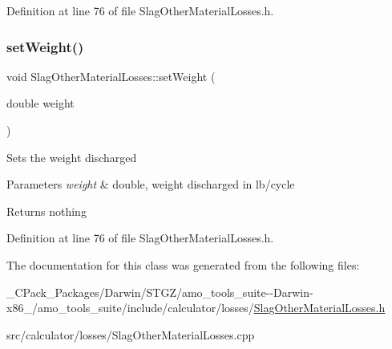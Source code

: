 Definition at line 76 of file Slag\+Other\+Material\+Losses.\+h.

\mbox{\label{class_slag_other_material_losses_a230a178f2ead59cd498b620e4bb4910f}} 
\subsubsection{\texorpdfstring{set\+Weight()}{setWeight()}\hspace{0.1cm}{\footnotesize\ttfamily [3/3]}}
{\footnotesize\ttfamily void Slag\+Other\+Material\+Losses\+::set\+Weight (\begin{DoxyParamCaption}\item[{double}]{weight }\end{DoxyParamCaption})\hspace{0.3cm}{\ttfamily [inline]}}

Sets the weight discharged


\begin{DoxyParams}{Parameters}
{\em weight} & double, weight discharged in lb/cycle\\
\hline
\end{DoxyParams}
\begin{DoxyReturn}{Returns}
nothing 
\end{DoxyReturn}


Definition at line 76 of file Slag\+Other\+Material\+Losses.\+h.



The documentation for this class was generated from the following files\+:\begin{DoxyCompactItemize}
\item 
\+\_\+\+C\+Pack\+\_\+\+Packages/\+Darwin/\+S\+T\+G\+Z/amo\+\_\+tools\+\_\+suite-\/-\/\+Darwin-\/x86\+\_/amo\+\_\+tools\+\_\+suite/include/calculator/losses/\hyperlink{___c_pack___packages_2_darwin_2_s_t_g_z_2amo__tools__suite--_darwin-x86__64_2amo__tools__suite_2dc0a6fddc3bab53e61620aff16484645}{Slag\+Other\+Material\+Losses.\+h}\item 
src/calculator/losses/Slag\+Other\+Material\+Losses.\+cpp\end{DoxyCompactItemize}

